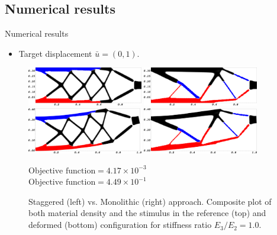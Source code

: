 \documentclass{beamer}
\begin{document}
\subsection{Numerical results}
\begin{frame}{Numerical results}
    \begin{itemize}
        \item Target displacement $\bar{u}=(0,1).$
    \end{itemize}
    \begin{figure}[H]
        \begin{multicols}{2}
            \includegraphics[width=0.45\textwidth]{figures/BeamLoadRatio1DirLS-Composite.png}\par
            \includegraphics[width=0.45\textwidth]{figures/BeamLoadRatio1DirLS-Composite2.png}\par
        \end{multicols}
        \begin{multicols}{2}
            \includegraphics[width=0.45\textwidth]{figures/BeamLoadRatio1DirLS-disp.png}\par
            \includegraphics[width=0.45\textwidth]{figures/BeamLoadRatio1DirLS-disp2.png}\par
        \end{multicols}
        \begin{multicols}{2}
            \centering
            $\text{Objective function}=4.17 \times 10^{-3}$\\
            $\text{Objective function}=4.49 \times 10^{-1}$
        \end{multicols}
        \caption{Staggered (left) vs. Monolithic (right) approach. Composite plot 
        of both material density and the stimulus in the reference (top) and deformed (bottom) configuration for stiffness ratio $E_3/E_2=1.0$.}
        \label{fig:schemeComparison}
    \end{figure}
\end{frame}
\end{document}
